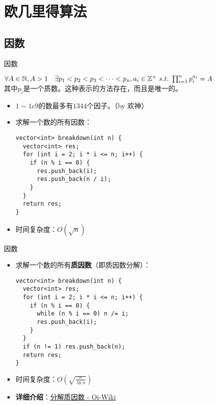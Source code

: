 \section{欧几里得算法}
\subsection{因数}
\begin{frame}[fragile]{因数}
  \begin{theorem}[算术基本定理]
    $\forall A\in \mathbb{N},A>1 \quad \exists p_1<p_2<p_3<\cdots<p_n,a_i\in \mathbb{Z}^+ \  \mathit{s.t.}\  \prod_{i=1}^n p_i^{a_i}=A$\\
    其中$p_i$是一个质数。这种表示的方法存在，而且是唯一的。
  \end{theorem}
  \pause 
  \begin{itemize}
    \item $1\sim 1e9$的数最多有$1344$个因子。（by 欢神）
    \pause
    \item 求解一个数的所有因数：
    \begin{lstlisting}
vector<int> breakdown(int n) {
  vector<int> res;
  for (int i = 2; i * i <= n; i++) {
    if (n % i == 0) {
      res.push_back(i);
      res.push_back(n / i);
    }
  }
  return res;
}
    \end{lstlisting}
    \item 时间复杂度：$O(\sqrt{n})$
  \end{itemize}
\end{frame}

\begin{frame}[fragile]{因数}
  \begin{itemize}
    \item 求解一个数的所有\textbf{质因数}（即质因数分解）：
    \pause
    \begin{lstlisting}
vector<int> breakdown(int n) {
  vector<int> res;
  for (int i = 2; i * i <= n; i++) {
    if (n % i == 0) {
      while (n % i == 0) n /= i;
      res.push_back(i);
    }
  }
  if (n != 1) res.push_back(n);
  return res;
}
    \end{lstlisting}
    \item 时间复杂度：$O(\sqrt{\frac{n}{\ln{n}}})$
    \pause
    \item \textbf{详细介绍}：\href{https://oi-wiki.org/math/pollard-rho/}{分解质因数 - Oi-Wiki} 
  \end{itemize}
\end{frame}

